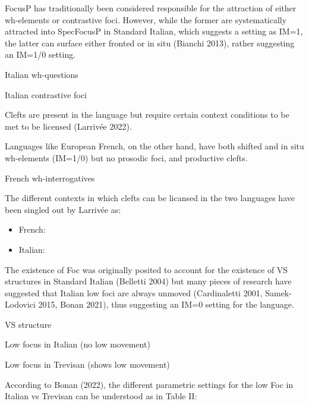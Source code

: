 \documentclass[fleqn,10pt]{wlscirep}
\begin{document}
FocusP has traditionally been considered responsible for the attraction of either wh-elements or contrastive foci. 
However, while the former are systematically attracted into SpecFocusP in Standard Italian, which suggests a setting as IM=1, the latter can surface either fronted or in situ (Bianchi 2013), rather suggesting an IM=1/0 setting. 

\begin{exe}
    \ex Italian wh-questions
\end{exe}

\begin{exe}
    \ex Italian contrastive foci
\end{exe}

Clefts are present in the language but require certain context conditions to be met to be licensed (Larrivée 2022). 

Languages like European French, on the other hand, have both shifted and in situ wh-elements (IM=1/0) but no prosodic foci, and productive clefts. 

\begin{exe}
    \ex French wh-interrogatives
\end{exe}

The different contexts in which clefts can be licansed in the two languages have been singled out by Larrivée as:
\begin{itemize}
    \item French:
    \item \vspace*{-2mm} Italian:
\end{itemize}

The existence of Foc was originally posited to account for the existence of VS structures in Standard Italian (Belletti 2004) but many pieces of research have suggested that Italian low foci are always unmoved (Cardinaletti 2001, Samek-Lodovici 2015, Bonan 2021), thus suggesting an IM=0 setting for the language. 

\begin{exe}
    \ex VS structure
\end{exe}

\begin{exe}
    \ex Low focus in Italian (no low movement)
\end{exe}

\begin{exe}
    \ex Low focus in Trevisan (shows low movement)
\end{exe}

According to Bonan (2022), the different parametric settings for the low Foc in Italian vs Trevisan can be understood as in Table II:
\end{document}
